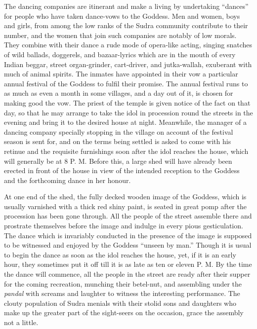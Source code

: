 \documentclass[a4paper, 12pt, oneside, english, twocolumn]{article}
\begin{document}
The dancing companies are itinerant and make a living by undertaking ``dances'' for people who have taken dance-vows to the Goddess. Men and women, boys and girls, from among the low ranks of the Sudra community contribute to their number, and the women that join such companies are notably of low morals. They combine with their dance a rude mode of opera-like acting, singing snatches of wild ballads, doggerels, and bazaar-lyrics which are in the mouth of every Indian beggar, street organ-grinder, cart-driver, and jutka-wallah, exuberant with much of animal spirits. The inmates have appointed in their vow a particular annual festival of the Goddess to fulfil their promise. The annual festival runs to as much as even a month in some villages, and a day out of it, is chosen for making good the vow. The priest of the temple is given notice of the fact on that day, so that he may arrange to take the idol in procession round the streets in the evening and bring it to the desired house at night. Meanwhile, the manager of a dancing company specially stopping in the village on account of the festival season is sent for, and on the terms being settled is asked to come with his retinue and the requisite furnishings soon after the idol reaches the house, which will generally be at 8 P. M. Before this, a large shed will have already been erected in front of the house in view of the intended reception to the Goddess and the forthcoming dance in her honour.

At one end of the shed, the fully decked wooden image of the Goddess, which is usually varnished with a thick red shiny paint, is seated in great pomp after the procession has been gone through. All the people of the street assemble there and prostrate themselves before the image and indulge in every pious gesticulation. The dance which is invariably conducted in the presence of the image is supposed to be witnessed and enjoyed by the Goddess ``unseen by man.'' Though it is usual to begin the dance as soon as the idol reaches the house, yet, if it is an early hour, they sometimes put it off till it is as late as ten or eleven P. M. By the time the dance will commence, all the people in the street are ready after their supper for the coming recreation, munching their betel-nut, and assembling under the \emph{pandal} with screams and laughter to witness the interesting performance. The clouty population of Sudra menials with their stolid sons and daughters who make up the greater part of the sight-seers on the occasion, grace the assembly not a little.
\end{document}
